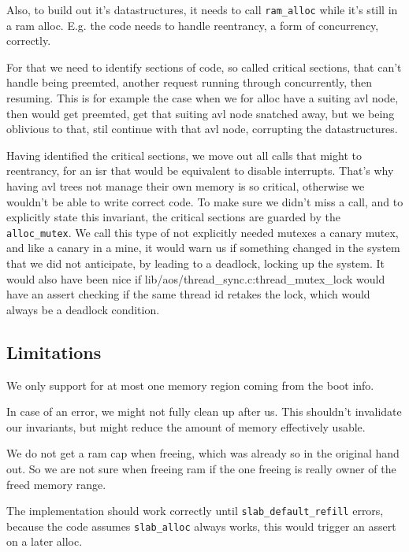 Also, to build out it's datastructures, it needs to call \verb|ram_alloc| while
it's still in a ram alloc.
E.g. the code needs to handle reentrancy, a form of concurrency, correctly.

For that we need to identify sections of code, so called critical sections, that
can't handle being preemted, another request running through concurrently, then
resuming.
This is for example the case when we for alloc have a suiting avl node, then
would get preemted, get that suiting avl node snatched away, but we being
oblivious to that, stil continue with that avl node, corrupting the
datastructures.

Having identified the critical sections, we move out all calls that might to
reentrancy, for an isr that would be equivalent to disable interrupts.
That's why having avl trees not manage their own memory is so critical,
otherwise we wouldn't be able to write correct code.
To make sure we didn't miss a call, and to explicitly state this invariant, the
critical sections are guarded by the \verb|alloc_mutex|.
We call this type of not explicitly needed mutexes a canary mutex, and like a
canary in a mine, it would warn us if something changed in the system that we
did not anticipate, by leading to a deadlock, locking up the system.
It would also have been nice if lib/aos/thread\_sync.c:thread\_mutex\_lock would
have an assert checking if the same thread id retakes the lock, which would
always be a deadlock condition.

% 
% 
% 

\subsection{Limitations}

We only support for at most one memory region coming from the boot info.

In case of an error, we might not fully clean up after us.
This shouldn't invalidate our invariants, but might reduce the amount of memory
effectively usable.

We do not get a ram cap when freeing, which was already so in the original hand
out.
So we are not sure when freeing ram if the one freeing is really owner of the
freed memory range.

The implementation should work correctly until \verb|slab_default_refill| errors,
because the code assumes \verb|slab_alloc| always works, this would trigger an
assert on a later alloc.
